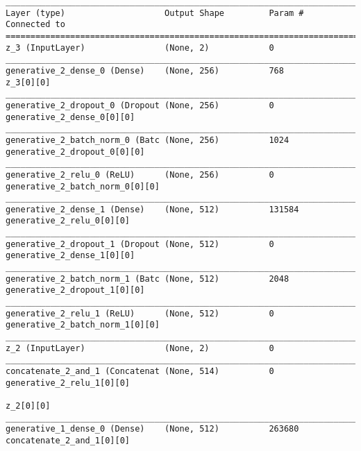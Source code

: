 \begin{lstlisting}[caption={CelebA-VLAE Decoder},captionpos=b,basicstyle=\tiny, label={lst:celeba-vlae-decoder}]
__________________________________________________________________________________________________
Layer (type)                    Output Shape         Param #     Connected to
==================================================================================================
z_3 (InputLayer)                (None, 2)            0
__________________________________________________________________________________________________
generative_2_dense_0 (Dense)    (None, 256)          768         z_3[0][0]
__________________________________________________________________________________________________
generative_2_dropout_0 (Dropout (None, 256)          0           generative_2_dense_0[0][0]
__________________________________________________________________________________________________
generative_2_batch_norm_0 (Batc (None, 256)          1024        generative_2_dropout_0[0][0]
__________________________________________________________________________________________________
generative_2_relu_0 (ReLU)      (None, 256)          0           generative_2_batch_norm_0[0][0]
__________________________________________________________________________________________________
generative_2_dense_1 (Dense)    (None, 512)          131584      generative_2_relu_0[0][0]
__________________________________________________________________________________________________
generative_2_dropout_1 (Dropout (None, 512)          0           generative_2_dense_1[0][0]
__________________________________________________________________________________________________
generative_2_batch_norm_1 (Batc (None, 512)          2048        generative_2_dropout_1[0][0]
__________________________________________________________________________________________________
generative_2_relu_1 (ReLU)      (None, 512)          0           generative_2_batch_norm_1[0][0]
__________________________________________________________________________________________________
z_2 (InputLayer)                (None, 2)            0
__________________________________________________________________________________________________
concatenate_2_and_1 (Concatenat (None, 514)          0           generative_2_relu_1[0][0]
                                                                 z_2[0][0]
__________________________________________________________________________________________________
generative_1_dense_0 (Dense)    (None, 512)          263680      concatenate_2_and_1[0][0]

\end{lstlisting}
